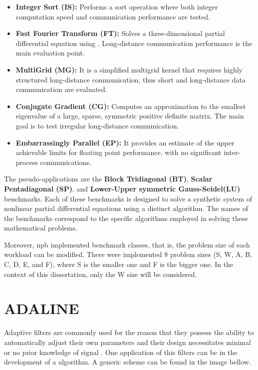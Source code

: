 \begin{itemize}
    \item \textbf{Integer Sort (IS):} Performs a sort operation where both integer computation speed and communication performance are tested.

    \item \textbf{Fast Fourier Transform (FT):} Solves a three-dimensional partial differential equation using . Long-distance communication performance is the main evaluation point. 

    \item \textbf{MultiGrid (MG):} It is a simplified multigrid kernel that requires highly structured long-distance communication, thus short and long-distance data communication are evaluated.

    \item \textbf{Conjugate Gradient (CG):} Computes an approximation to
    the smallest eigenvalue of a large, sparse, symmetric positive definite matrix. The main goal is to test irregular long-distance communication.

    \item \textbf{Embarrassingly Parallel (EP):} It provides an estimate of the
    upper achievable limits for floating point performance, with no significant inter-process communications.
\end{itemize}

The pseudo-applications are the \textbf{Block Tridiagonal (BT)}, \textbf{Scalar Pentadiagonal (SP)}, and \textbf{Lower-Upper symmetric Gauss-Seidel(LU)} benchmarks. Each of these benchmarks is designed to solve a synthetic system of nonlinear partial differential equations using a distinct algorithm. The names of the benchmarks correspond to the specific algorithms employed in solving these mathematical problems.

Moreover, \gls{npb} implemented benchmark classes, that is, the problem size of each workload can be modified. There were implemented 8 problem sizes (S, W, A, B, C, D, E, and F), where S is the smaller one and F is the bigger one. In the context of this dissertation, only the W size will be considered.

\section{ADALINE}

Adaptive filters are commonly used for the reason that they possess the ability to automatically adjust their own parameters and their design necessitates minimal or no prior knowledge of signal \cite{haykin1996linear}. One application of this filters can be in the development of a  algorithm. A generic scheme can be found in the image bellow.

